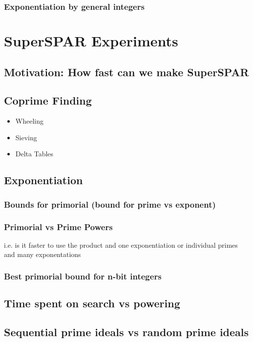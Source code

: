 \documentclass{ucalgthes1}
\theoremstyle{definition}
\begin{document}
\subsection{Exponentiation by general integers}

\chapter{SuperSPAR Experiments}

\section{Motivation: How fast can we make SuperSPAR}

\section{Coprime Finding}
\begin{itemize}
\item Wheeling
\item Sieving
\item Delta Tables
\end{itemize}

\section{Exponentiation}
\subsection{Bounds for primorial (bound for prime vs exponent)}
\subsection{Primorial vs Prime Powers}
i.e. is it faster to use the product and one exponentiation or individual primes and many exponentations
\subsection{Best primorial bound for n-bit integers}

\section{Time spent on search vs powering}

\section{Sequential prime ideals vs random prime ideals}
\end{document}
